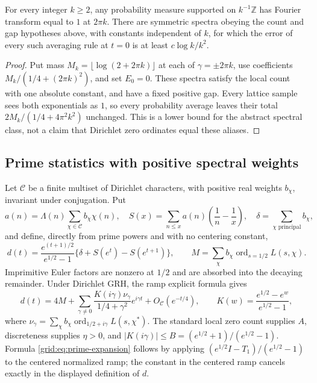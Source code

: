 \begin{proposition}
For every integer $k\ge2$, any probability measure supported on
$k^{-1}\mathbb Z$ has Fourier transform equal to $1$ at $2\pi k$.
There are symmetric spectra obeying the count and gap hypotheses above,
with constants independent of $k$, for which the error of every such
averaging rule at $t=0$ is at least $c\log k/k^2$.
\end{proposition}
\begin{proof}
Put mass $M_k=\lfloor\log(2+2\pi k)\rfloor$ at each of
$\gamma=\pm2\pi k$, use coefficients
$M_k/(1/4+(2\pi k)^2)$, and set $E_0=0$. These spectra satisfy the
local count with one absolute constant, and have a fixed positive gap.
Every lattice sample sees both exponentials as $1$, so every probability
average leaves their total $2M_k/(1/4+4\pi^2k^2)$ unchanged.
This is a lower bound for the abstract spectral class, not a claim that
Dirichlet zero ordinates equal these aliases.
\end{proof}

\subsection{Prime statistics with positive spectral weights}

Let $\mathcal C$ be a finite multiset of Dirichlet characters, with positive
real weights $b_\chi$, invariant under conjugation. Put
\[
 a(n)=\Lambda(n)\sum_{\chi\in\mathcal C}b_\chi\chi(n),\quad
 S(x)=\sum_{n\le x}a(n)\left(\frac1n-\frac1x\right),\quad
 \delta=\sum_{\chi\text{ principal}}b_\chi,
\]
and define, directly from prime powers and with no centering constant,
\[
 d(t)=\frac{e^{(t+1)/2}}{e^{1/2}-1}
 \{\delta+S(e^t)-S(e^{t+1})\},\qquad
 M=\sum_\chi b_\chi\operatorname{ord}_{s=1/2}L(s,\chi).
\]
Imprimitive Euler factors are nonzero at $1/2$ and are absorbed into the
decaying remainder. Under Dirichlet GRH, the ramp explicit formula gives
\begin{equation}\label{grid:eq:prime-expansion}
 d(t)=4M+\sum_{\gamma\ne0}
 \frac{K(i\gamma)\nu_\gamma}{1/4+\gamma^2}e^{i\gamma t}
 +O_{\mathcal C}(e^{-t/4}),\qquad
 K(w)=\frac{e^{1/2}-e^w}{e^{1/2}-1},
\end{equation}
where $\nu_\gamma=\sum_\chi b_\chi\operatorname{ord}_{1/2+i\gamma}L(s,\chi^*)$.
The standard local zero count supplies $A$, discreteness supplies $\eta>0$,
and $|K(i\gamma)|\le B=(e^{1/2}+1)/(e^{1/2}-1)$. Formula
\eqref{grid:eq:prime-expansion} follows by applying
$(e^{1/2}I-T_1)/(e^{1/2}-1)$ to the centered normalized ramp; the constant
in the centered ramp cancels exactly in the displayed definition of $d$.

